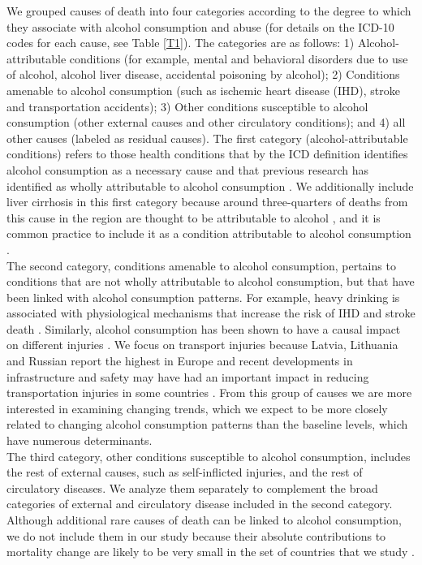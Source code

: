 \documentclass{article}
\begin{document}
\begin{spacing}{1.5}
We grouped causes of death into four categories according to the degree to which they associate with alcohol consumption and abuse (for details on the ICD-10 codes for each cause, see Table \ref{T1}). The categories are as follows:
1) Alcohol-attributable conditions (for example, mental and behavioral disorders due to use of alcohol, alcohol liver disease, accidental poisoning by alcohol); 2) Conditions amenable to alcohol consumption (such as ischemic heart disease (IHD), stroke and transportation accidents); 3) Other conditions susceptible to alcohol consumption (other external causes and other circulatory conditions); and 4) all other causes (labeled as residual causes). 
The first category (alcohol-attributable conditions) refers to those health conditions that by the ICD definition identifies alcohol consumption as a necessary cause and that previous research has identified as wholly attributable to alcohol consumption \citep{rehm2010relation}. We additionally include liver cirrhosis in this first category because around three-quarters of deaths from this cause in the region are thought to be attributable to alcohol \citep{rehm2003relationship}, and it is common practice to include it as a condition attributable to alcohol consumption \citep{rehm2003relationship,rehm2010relation}. \\
	
The second category, conditions amenable to alcohol consumption, pertains to conditions that are not wholly attributable to alcohol consumption, but that have been linked with alcohol consumption patterns. For example, heavy drinking is associated with physiological mechanisms that increase the risk of IHD and stroke death \citep{rehm2010relation}.  Similarly, alcohol consumption has been shown to have a causal impact on different injuries \citep{rehm2003relationship}. We focus on transport injuries because Latvia,
Lithuania and Russian report the highest in Europe \citep{avenoso2005safety} and recent developments in infrastructure and safety may have had an important impact in reducing transportation injuries in some countries \citep{world2009european,world2013global}. From this group of causes we are more interested in examining changing trends, which we expect to be more closely related to changing alcohol consumption patterns than the baseline levels, which have numerous determinants. \\

The third category, other conditions susceptible to alcohol consumption, includes the rest of external causes, such as self-inflicted injuries, and the rest of circulatory diseases. We analyze them separately to complement the broad categories of external and circulatory disease included in the second category. Although additional rare causes of death can be linked to alcohol consumption, we do not include them in our study because their absolute contributions to mortality change are likely to be very small in the set of countries that we study \citep{grigoriev2015}.



\end{spacing}
\end{document}
